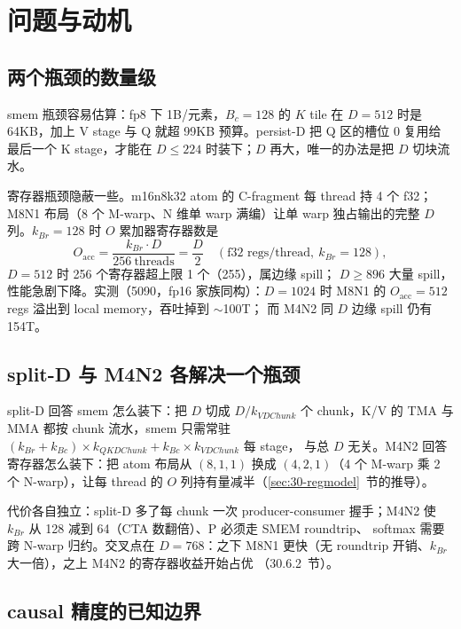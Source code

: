 \section{问题与动机}

\subsection{两个瓶颈的数量级}

smem 瓶颈容易估算：fp8 下 1B/元素，$B_c=128$ 的 $K$ tile 在 $D=512$ 时是
64KB，加上 V stage 与 Q 就超 99KB 预算。persist-D 把 Q 区的槽位 0 复用给
最后一个 K stage，才能在 $D\le 224$ 时装下；$D$ 再大，唯一的办法是把 $D$ 切块流水。

寄存器瓶颈隐蔽一些。m16n8k32 atom 的 C-fragment 每 thread 持 4 个 f32；
M8N1 布局（8 个 M-warp、N 维单 warp 满编）让单 warp 独占输出的完整 $D$
列。$k_{Br}=128$ 时 $O$ 累加器寄存器数是
\begin{equation}\label{eq:30-oacc-m8n1}
O_{\text{acc}}=\frac{k_{Br}\cdot D}{256\ \text{threads}}=\frac{D}{2}
\quad(\text{f32 regs/thread},\ k_{Br}=128),
\end{equation}
$D=512$ 时 256 个寄存器超上限 1 个（255），属边缘 spill；
$D\ge 896$ 大量 spill，性能急剧下降。实测（5090，fp16 家族同构）：$D=1024$ 时 M8N1 的
$O_{\text{acc}}=512$ regs 溢出到 local memory，吞吐掉到 $\sim$100T；
而 M4N2 同 $D$ 边缘 spill 仍有 154T。

\subsection{split-D 与 M4N2 各解决一个瓶颈}

split-D 回答 smem 怎么装下：把 $D$ 切成 $D/k_{VDChunk}$ 个
chunk，K/V 的 TMA 与 MMA 都按 chunk 流水，smem 只需常驻
$(k_{Br}+k_{Bc})\times k_{QKDChunk}+k_{Bc}\times k_{VDChunk}$ 每 stage，
与总 $D$ 无关。M4N2 回答寄存器怎么装下：把 atom 布局从
$(8,1,1)$ 换成 $(4,2,1)$（4 个 M-warp 乘 2 个 N-warp），让每
thread 的 $O$ 列持有量减半（\ref{sec:30-regmodel}~节的推导）。

代价各自独立：split-D 多了每 chunk 一次 producer-consumer 握手；M4N2
使 $k_{Br}$ 从 128 减到 64（CTA 数翻倍）、P 必须走 SMEM roundtrip、
softmax 需要跨 N-warp 归约。交叉点在 $D=768$：之下 M8N1 更快（无
roundtrip 开销、$k_{Br}$ 大一倍），之上 M4N2 的寄存器收益开始占优
（30.6.2~节）。

\subsection{causal 精度的已知边界}

